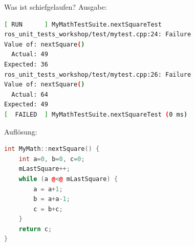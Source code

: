 \documentclass{beamer}
\begin{document}
\begin{frame}[fragile]{Was ist schiefgelaufen?}
Ausgabe:
\begin{lstlisting}[language=bash, numbers=none]
[ RUN      ] MyMathTestSuite.nextSquareTest
ros_unit_tests_workshop/test/mytest.cpp:24: Failure
Value of: nextSquare()
  Actual: 49
Expected: 36
ros_unit_tests_workshop/test/mytest.cpp:26: Failure
Value of: nextSquare()
  Actual: 64
Expected: 49
[  FAILED  ] MyMathTestSuite.nextSquareTest (0 ms)
\end{lstlisting}
\pause
Auflösung:
\begin{lstlisting}[language=c++, style=using_colors]
int MyMath::nextSquare() {
	int a=0, b=0, c=0;
	mLastSquare++;
	while (a @<@ mLastSquare) {
		a = a+1;
		b = a+a-1;
		c = b+c;
	}
	return c;
}
\end{lstlisting}
\end{frame}
\end{document}
